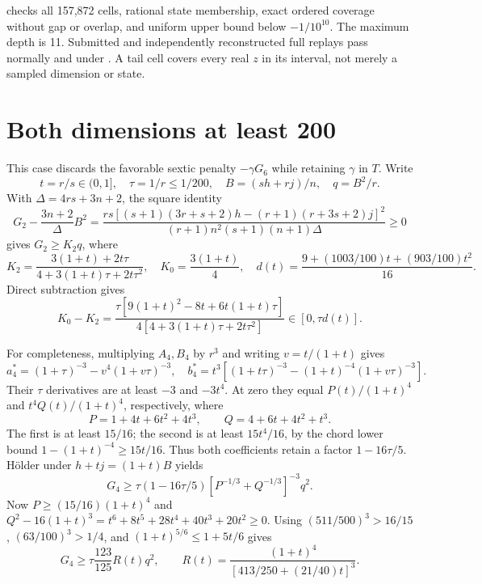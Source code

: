 \documentclass[11pt]{article}
\newcommand{\code}[1]{\texttt{\detokenize{#1}}}
\begin{document}
\code{check_sextic_tail.py} checks all 157,872 cells, rational state membership, exact ordered coverage without gap or overlap, and uniform upper bound below $-1/10^{10}$. The maximum depth is 11. Submitted and independently reconstructed full replays pass normally and under \code{-O}. A tail cell covers every real $z$ in its interval, not merely a sampled dimension or state.

\section{Both dimensions at least 200}
This case discards the favorable sextic penalty $-\gamma G_6$ while retaining $\gamma$ in $T$. Write
\[
 t=r/s\in(0,1],\quad \tau=1/r\le1/200,\quad B=(sh+rj)/n,\quad q=B^2/r.
\]
With $\Delta=4rs+3n+2$, the square identity
\[
 G_2-\frac{3n+2}{\Delta}B^2=
 \frac{rs[(s+1)(3r+s+2)h-(r+1)(r+3s+2)j]^2}
 {(r+1)n^2(s+1)(n+1)\Delta}\ge0
\]
gives $G_2\ge K_2q$, where
\[
 K_2=\frac{3(1+t)+2t\tau}{4+3(1+t)\tau+2t\tau^2},\quad K_0=\frac{3(1+t)}4,
 \quad d(t)=\frac{9+(1003/100)t+(903/100)t^2}{16}.
\]
Direct subtraction gives
\[
 K_0-K_2=\frac{\tau[9(1+t)^2-8t+6t(1+t)\tau]}
 {4[4+3(1+t)\tau+2t\tau^2]}\in[0,\tau d(t)].
\]

For completeness, multiplying $A_4,B_4$ by $r^3$ and writing $v=t/(1+t)$ gives
\[
 a_4^*=(1+\tau)^{-3}-v^4(1+v\tau)^{-3},\quad
 b_4^*=t^3[(1+t\tau)^{-3}-(1+t)^{-4}(1+v\tau)^{-3}].
\]
Their $\tau$ derivatives are at least $-3$ and $-3t^4$. At zero they equal
$P(t)/(1+t)^4$ and $t^4Q(t)/(1+t)^4$, respectively, where
\[
 P=1+4t+6t^2+4t^3,\qquad Q=4+6t+4t^2+t^3.
\]
The first is at least $15/16$; the second is at least $15t^4/16$, by the chord lower bound $1-(1+t)^{-4}\ge15t/16$. Thus both coefficients retain a factor $1-16\tau/5$. H\"older under $h+tj=(1+t)B$ yields
\[
 G_4\ge\tau(1-16\tau/5)[P^{-1/3}+Q^{-1/3}]^{-3}q^2.
\]
Now $P\ge(15/16)(1+t)^4$ and
$Q^2-16(1+t)^3=t^6+8t^5+28t^4+40t^3+20t^2\ge0$.
Using $(511/500)^3>16/15$, $(63/100)^3>1/4$, and
$(1+t)^{5/6}\le1+5t/6$ gives
\[
 G_4\ge\tau\frac{123}{125}R(t)q^2,\qquad
 R(t)=\frac{(1+t)^4}{[413/250+(21/40)t]^3}.
\]
\end{document}
